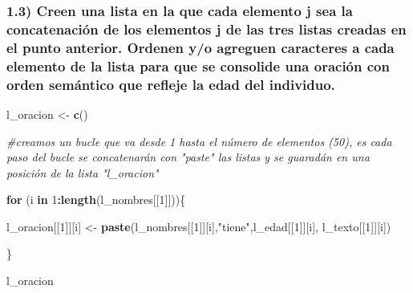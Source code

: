 \documentclass[
]{article}
\newenvironment{Shaded}{\begin{snugshade}}{\end{snugshade}}
\newcommand{\CommentTok}[1]{\textcolor[rgb]{0.56,0.35,0.01}{\textit{#1}}}
\newcommand{\ControlFlowTok}[1]{\textcolor[rgb]{0.13,0.29,0.53}{\textbf{#1}}}
\newcommand{\DecValTok}[1]{\textcolor[rgb]{0.00,0.00,0.81}{#1}}
\newcommand{\FunctionTok}[1]{\textcolor[rgb]{0.13,0.29,0.53}{\textbf{#1}}}
\newcommand{\NormalTok}[1]{#1}
\newcommand{\OtherTok}[1]{\textcolor[rgb]{0.56,0.35,0.01}{#1}}
\newcommand{\SpecialCharTok}[1]{\textcolor[rgb]{0.81,0.36,0.00}{\textbf{#1}}}
\newcommand{\StringTok}[1]{\textcolor[rgb]{0.31,0.60,0.02}{#1}}
\begin{document}
\hypertarget{creen-una-lista-en-la-que-cada-elemento-j-sea-la-concatenaciuxf3n-de-los-elementos-j-de-las-tres-listas-creadas-en-el-punto-anterior.-ordenen-yo-agreguen-caracteres-a-cada-elemento-de-la-lista-para-que-se-consolide-una-oraciuxf3n-con-orden-semuxe1ntico-que-refleje-la-edad-del-individuo.}{%
\subsubsection{1.3) Creen una lista en la que cada elemento j sea la
concatenación de los elementos j de las tres listas creadas en el punto
anterior. Ordenen y/o agreguen caracteres a cada elemento de la lista
para que se consolide una oración con orden semántico que refleje la
edad del
individuo.}\label{creen-una-lista-en-la-que-cada-elemento-j-sea-la-concatenaciuxf3n-de-los-elementos-j-de-las-tres-listas-creadas-en-el-punto-anterior.-ordenen-yo-agreguen-caracteres-a-cada-elemento-de-la-lista-para-que-se-consolide-una-oraciuxf3n-con-orden-semuxe1ntico-que-refleje-la-edad-del-individuo.}}

\begin{Shaded}
\begin{Highlighting}[]
\NormalTok{l\_oracion }\OtherTok{\textless{}{-}} \FunctionTok{c}\NormalTok{()}

\CommentTok{\#creamos un bucle que va desde 1 hasta el número de elementos (50), es cada paso del bucle se concatenarán con "paste" las listas y se guaradán en una posición de la lista "l\_oracion"}

\ControlFlowTok{for}\NormalTok{ (i }\ControlFlowTok{in} \DecValTok{1}\SpecialCharTok{:}\FunctionTok{length}\NormalTok{(l\_nombres[[}\DecValTok{1}\NormalTok{]]))\{}
  
\NormalTok{  l\_oracion[[}\DecValTok{1}\NormalTok{]][i] }\OtherTok{\textless{}{-}} \FunctionTok{paste}\NormalTok{(l\_nombres[[}\DecValTok{1}\NormalTok{]][i],}\StringTok{"tiene"}\NormalTok{,l\_edad[[}\DecValTok{1}\NormalTok{]][i],}
\NormalTok{                          l\_texto[[}\DecValTok{1}\NormalTok{]][i])    }
  
\NormalTok{\}}

\NormalTok{l\_oracion}
\end{Highlighting}
\end{Shaded}
\end{document}
